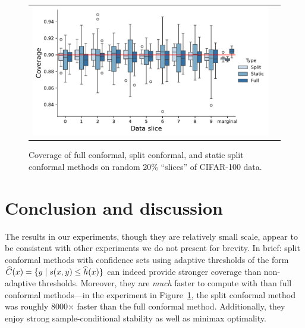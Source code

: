 \documentclass{article}
\newcommand{\scorefunc}{s}
\newcommand{\scoreval}{\scorefunc}
\begin{document}
\begin{figure}
  \begin{center}
    \begin{tabular}{cc}
      \begin{minipage}{.78\columnwidth}
        \includegraphics[width=\columnwidth]{Images/random_directions_experiment}
      \end{minipage} &
      \hspace{-1cm}
      \begin{minipage}{.28\columnwidth}
        \caption{\label{fig:random-directions} Coverage of full conformal, split
          conformal, and static split conformal methods on random 20\%
          ``slices'' of CIFAR-100 data.}
      \end{minipage}
    \end{tabular}
  \end{center}
\end{figure}

\section{Conclusion and discussion}

The results in our experiments, though they are relatively small scale,
appear to be consistent with other experiments we do not present for
brevity.
%
In brief: split conformal methods with confidence sets using adaptive
thresholds of the form $\what{C}(x) = \{y \mid \scoreval(x, y) \le
\what{h}(x)\}$ can indeed provide stronger coverage than non-adaptive
thresholds.
%
Moreover, they are \emph{much} faster to compute with than full conformal
methods---in the experiment in Figure~\ref{fig:random-directions},
the split conformal method was roughly 8000$\times$ faster than
the full conformal method.
%
Additionally, they enjoy strong sample-conditional stability
as well as minimax optimality.
\end{document}
